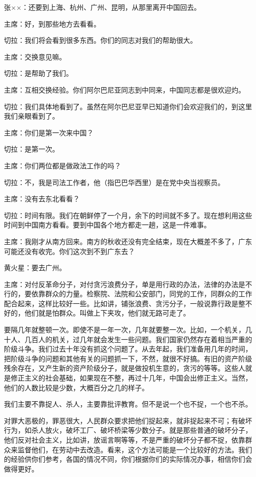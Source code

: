 张××：还要到上海、杭州、广州、昆明，从那里离开中国回去。

主席：好，到那些地方去看看。

切拉：我们将会看到很多东西。你们的同志对我们的帮助很大。

主席：交换意见嘛。

切拉：是帮助了我们。

主席：互相交换经验。你们阿尔巴尼亚同志到中同来，中国同志都是很欢迎灼。

切拉：我们具体地看到了。虽然在阿尔巴尼亚早已知道你们会欢迎我们的，到这里我们亲眼看到了。

主席：你们是第一次来中国？

切拉：是第一次。

主席：你们两位都是做政法工作的吗？

切拉：不，我是司法工作者，他（指巴巴华西里）是在党中央当视察员。

主席：没有去东北看看？

切拉：时间有限。我们在朝鲜停了一个月，余下的时间就不多了。现在想利用这些时间到中国南方看看。要到中国各个地方都走一趟，这是一件难事。

主席：我刚才从南方回来。南方的秋收还没有完全结束，现在大概差不多了，广东可能还没有收完。你们这次到不到广东去？

黄火星：要去广州。

主席：对付反革命分子，对付贪污浪费分子，单是用行政的办法，法律的办法是不行的，要依靠群众的力量。检察院、法院和公安部门，同党的工作，同群众的工作配合起来，这样比较好一些。比如讲，铺张浪费、贪污分子，一般说靠行政是整不好的，他们就是怕群众。叫做上下夹攻，他们就无路可走了。

要隔几年就整顿一次。即使不是一年一次，几年就要整一次。比如，一个机关，几十人、几百人的机关，过几年就会发生一些问题。我们国家仍然存在着相当严重的阶级斗争。我们过去十年没有抓这个问题了。从去年起，我们准备用几年的时间，把阶级斗争的问题和其他有关的问题抓一下，不然，就很不好搞。有旧的资产阶级残余存在，又产生新的资产阶级分子，就是做投机生意的，贪污的等等。这些人就是修正主义的社会基础，如果现在不整，再过十几年，中国会出修正主义。当然，他们的人数比较是少数，大概百分之几的样子。

我们主要不靠捉人、杀人，主要靠批评教育。但不是说一个也不捉，一个也不杀。

对罪大恶极的，罪恶很大，人民群众要求把他们捉起来，就非捉起来不可；有破坏行为，如杀人放火，破坏工厂、破坏桥梁等少数分子。就是那些普通的破坏分子，他们反对社会主义，比如讲，放谣言啊等等，不是严重的破坏分子都不捉，依靠群众来监督他们，在劳动中去改造。看来，这个方法可能是一个比较好的方法。我们的经验供你们参考，各国的情况不同，你们根据你们的实际情况办事，相信你们会做得更好。

